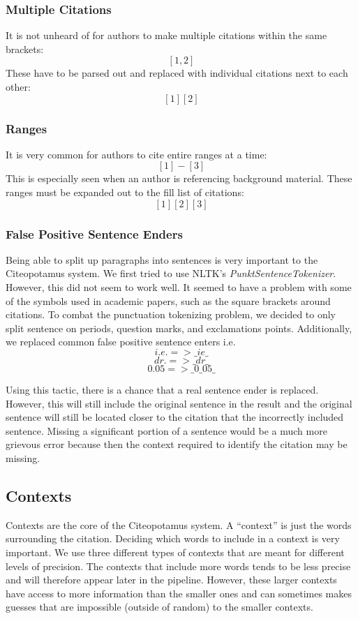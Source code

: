 \documentclass[10pt, conference, compsocconf]{IEEEtran}
\begin{document}
\subsubsection{Multiple Citations}
It is not unheard of for authors to make multiple citations within the same brackets: $$[1, 2]$$
These have to be parsed out and replaced with individual citations next to each other: $$[1][2]$$

\subsubsection{Ranges}
It is very common for authors to cite entire ranges at a time: $$[1] - [3]$$
This is especially seen when an author is referencing background material. These ranges must be expanded out to
the fill list of citations: $$[1][2][3]$$

\subsubsection{False Positive Sentence Enders}\label{sec:fpEnders}
Being able to split up paragraphs into sentences is very important to the Citeopotamus system.
We first tried to use NLTK's \textit{PunktSentenceTokenizer}. However, this did not seem to work well.
It seemed to have a problem with some of the symbols used in academic papers, such as the square brackets around
citations. To combat the punctuation tokenizing problem, we decided to only split sentence on periods, question marks, and
exclamations points. Additionally, we replaced common false positive sentence enters i.e.
$$i.e. => \_ie\_$$
$$dr. => \_dr\_$$
$$0.05 => \_0\_05\_$$

Using this tactic, there is a chance that a real sentence ender is replaced. However, this will still
include the original sentence in the result and the original sentence will still be located closer to the
citation that the incorrectly included sentence. Missing a significant portion of a sentence would be a much more
grievous error because then the context required to identify the citation may be missing.

\subsection{Contexts}\label{sec:context}
Contexts are the core of the Citeopotamus system. A ``context'' is just the words surrounding the citation.
Deciding which words to include in a context is very important. We use three different types of contexts that are meant for different
levels of precision. The contexts that include more words tends to be less precise and will therefore appear later in the pipeline.
However, these larger contexts have access to more information than the smaller ones and can sometimes makes guesses that are impossible
(outside of random) to the smaller contexts.
\end{document}
